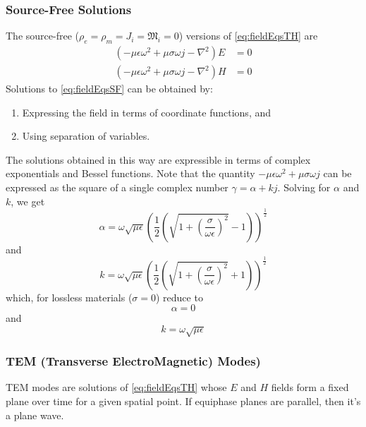 \documentclass{article}
\begin{document}
\subsubsection{Source-Free Solutions}
The source-free ($\rho_e = \rho_m = J_i = \mathfrak{M}_i = 0$) versions of \eqref{eq:fieldEqsTH} are
\begin{subequations} \label{eq:fieldEqsSF}
    \begin{align}
    (- \mu \epsilon \omega^2 + \mu \sigma \omega j - \nabla^2 ) E & = 0 \label{eq:electricFieldEqSF} \\
    ( - \mu \epsilon \omega^2 + \mu \sigma \omega j - \nabla^2 ) H & = 0 \label{eq:magneticFieldEqSF}
    \end{align}
\end{subequations}
Solutions to \eqref{eq:fieldEqsSF} can be obtained by:
\begin{enumerate}
    \item Expressing the field in terms of coordinate functions, and
    \item Using separation of variables.
\end{enumerate}
The solutions obtained in this way are expressible in terms of complex exponentials and Bessel functions.
Note that the quantity $- \mu \epsilon \omega^2 + \mu \sigma \omega j $ can be expressed as the square of a single complex number $\gamma = \alpha + kj$. Solving for $\alpha$ and $k$, we get
\begin{equation} \label{eq:attenuationConstant}
    \alpha = \omega \sqrt{\mu \epsilon} \left( \frac{1}{2} \left( \sqrt{1 + \left( \frac{\sigma}{\omega \epsilon} \right)^2 } - 1 \right)  \right)^{\frac{1}{2}}
\end{equation}
and
\begin{equation} \label{eq:wavenumber}
    k = \omega \sqrt{\mu \epsilon} \left( \frac{1}{2} \left( \sqrt{1 + \left( \frac{\sigma}{\omega \epsilon} \right)^2 } + 1 \right)  \right)^{\frac{1}{2}}
\end{equation}
which, for lossless materials ($\sigma = 0$) reduce to
\begin{equation} \label{eq:attenuationConstantLossless}
    \alpha = 0
\end{equation}
and
\begin{equation} \label{eq:wavenumberLossless}
    k = \omega \sqrt{\mu \epsilon}
\end{equation}
\subsubsection{TEM (Transverse ElectroMagnetic) Modes)}
TEM modes are solutions of \eqref{eq:fieldEqsTH} whose $E$ and $H$ fields form a fixed plane over time for a given spatial point.
If equiphase planes are parallel, then it's a plane wave.
\end{document}
